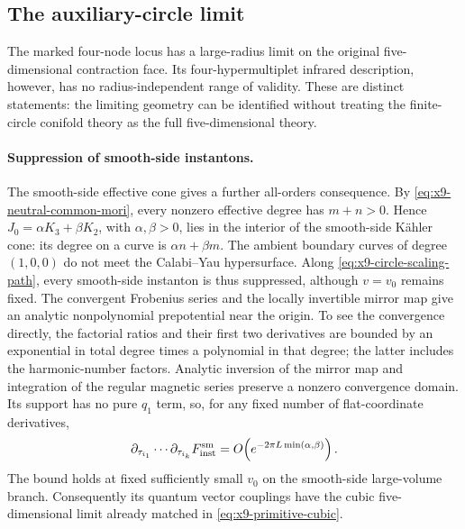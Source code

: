 \subsection{The auxiliary-circle limit}
\label{subsec:x9-circle-limit}

The marked four-node locus has a large-radius limit on the original
five-dimensional contraction face. Its four-hypermultiplet infrared
description, however, has no radius-independent range of validity.
These are distinct statements: the limiting geometry can be identified
without treating the finite-circle conifold theory as the full
five-dimensional theory.

\paragraph{Suppression of smooth-side instantons.}
The smooth-side effective cone gives a further all-orders consequence. By
\eqref{eq:x9-neutral-common-mori}, every nonzero effective degree
has $m+n>0$. Hence $J_0=\alpha K_3+\beta K_2$, with
$\alpha,\beta>0$, lies in the interior of the smooth-side K\"ahler
cone: its degree on a curve is $\alpha n+\beta m$.
The ambient boundary curves of degree $(1,0,0)$ do not meet the
Calabi--Yau hypersurface. Along
\eqref{eq:x9-circle-scaling-path}, every smooth-side instanton is thus
suppressed, although $v=v_0$ remains fixed. The convergent
Frobenius series and the locally invertible mirror map give an
analytic nonpolynomial prepotential near the origin. To see the
convergence directly, the factorial ratios and their first two
derivatives are bounded by an exponential in total degree times
a polynomial in that degree; the latter includes the harmonic-number
factors. Analytic inversion of the mirror map and integration of the
regular magnetic series preserve a nonzero convergence domain. Its support
has no pure $q_1$ term, so, for any fixed number of flat-coordinate
derivatives,
\begin{equation}
 \partial_{\tau_{i_1}}\cdots\partial_{\tau_{i_k}}
 F^{\rm sm}_{\rm inst}
 =O\!\left(e^{-2\pi L\min(\alpha,\beta)}\right).
 \label{eq:x9-neutral-instanton-suppression}
\end{equation}
The bound holds at fixed sufficiently small $v_0$ on the smooth-side
large-volume branch. Consequently its quantum vector couplings have
the cubic five-dimensional limit already matched in
\eqref{eq:x9-primitive-cubic}.
